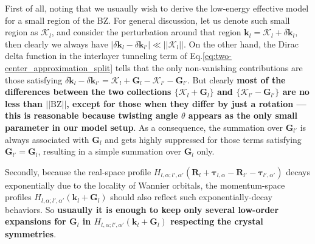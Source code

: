First of all, noting that we usuaully wish to derive the low-energy effective model for a small region of the BZ. For general discussion, let us denote such small region as $\bm{\mathcal K}_l$, and consider the perturbation around that region $\bm k_l=\bm{\mathcal K}_l+\delta\bm k_l$, then clearly we always have $|\delta\bm k_l-\delta\bm k_{l'}|\ll||\bm{\mathcal K}_l||$. On the other hand, the Dirac delta function in the interlayer tunneling term of Eq.\eqref{eq:two-center_approximation_split} tells that the only non-vanishing contributions are those satisfying $\delta\bm k_l-\delta\bm k_{l'}=\bm{\mathcal K}_l+\bm G_l-\bm{\mathcal K}_{l'}-\bm G_{l'}$. But clearly \textbf{most of the differences between the two collections $\{\bm{\mathcal K}_l+\bm G_l\}$ and $\{\bm{\mathcal K}_{l'}-\bm G_{l'}\}$ are no less than $||\text{BZ}||$, except for those when they differ by just a rotation --- this is reasonable because twisting angle $\theta$ appears as the only small parameter in our model setup}. As a consequence, the summation over $\bm G_{l'}$ is always associated with $\bm G_l$ and gets highly suppressed for those terms satisfying $\bm G_{l'}=\bm G_l$, resulting in a simple summation over $\bm G_l$ only.

Secondly, because the real-space profile $H_{l,\alpha;l',\alpha'}(\bm R_l+\bm\tau_{l,\alpha}-\bm R_{l'}-\bm\tau_{l',\alpha'})$ decays exponentially due to the locality of Wannier orbitals, the momentum-space profiles $H_{l,\alpha;l',\alpha'}(\bm k_l+\bm G_l)$ should also reflect such exponentially-decay behaviors. So \textbf{usuaully it is enough to keep only several low-order expansions for $\bm G_l$ in $H_{l,\alpha;l',\alpha'}(\bm k_l+\bm G_l)$ respecting the crystal symmetries}.


